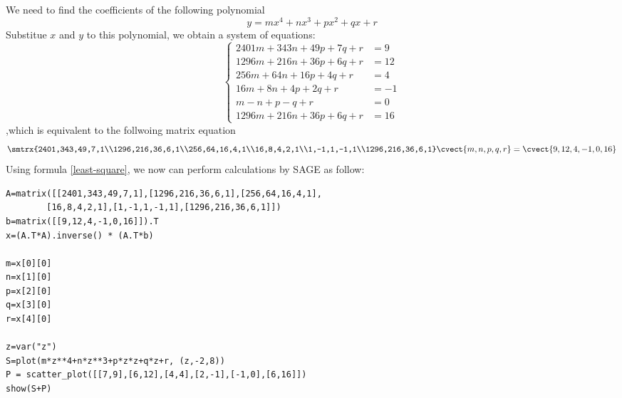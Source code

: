 \begin{solution}
We need to find the coefficients of the following polynomial
\[ y=mx^4+nx^3+px^2+qx+r \]
Substitue $x$ and $y$ to this polynomial, we obtain a system of equations:
\begin{equation*}
\begin{cases}
2401m+343n+49p+7q+r &=9\\
1296m+216n+36p+6q+r &=12\\
256m+64n+16p+4q+r &=4\\
16m+8n+4p+2q+r &=-1\\
m-n+p-q+r&=0\\
1296m+216n+36p+6q+r &=16
\end{cases}
\end{equation*}
,which is equivalent to the follwoing matrix equation
\[ \smtrx{2401,343,49,7,1\\1296,216,36,6,1\\256,64,16,4,1\\16,8,4,2,1\\1,-1,1,-1,1\\1296,216,36,6,1} \cvect{m,n,p,q,r} = \cvect{9,12,4,-1,0,16} \]
Using formula \eqref{least-square}, we now can perform calculations by SAGE as follow:
\begin{verbatim}
A=matrix([[2401,343,49,7,1],[1296,216,36,6,1],[256,64,16,4,1],
        [16,8,4,2,1],[1,-1,1,-1,1],[1296,216,36,6,1]])
b=matrix([[9,12,4,-1,0,16]]).T
x=(A.T*A).inverse() * (A.T*b) 

m=x[0][0]
n=x[1][0]
p=x[2][0]
q=x[3][0]
r=x[4][0]

z=var("z")
S=plot(m*z**4+n*z**3+p*z*z+q*z+r, (z,-2,8))
P = scatter_plot([[7,9],[6,12],[4,4],[2,-1],[-1,0],[6,16]])
show(S+P)
\end{verbatim}
\end{solution}